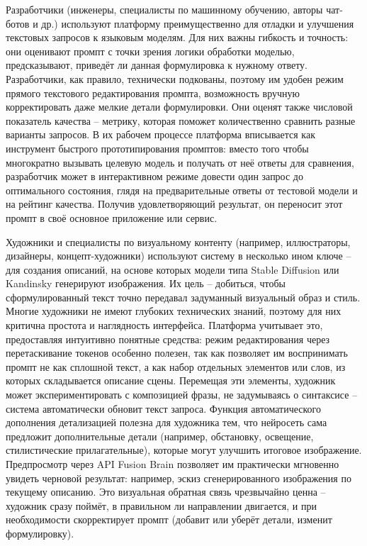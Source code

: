 Разработчики (инженеры, специалисты по машинному обучению, авторы чат-ботов и др.) используют платформу преимущественно для отладки и улучшения текстовых запросов к языковым моделям. Для них важны гибкость и точность: они оценивают промпт с точки зрения логики обработки моделью, предсказывают, приведёт ли данная формулировка к нужному ответу. Разработчики, как правило, технически подкованы, поэтому им удобен режим прямого текстового редактирования промпта, возможность вручную корректировать даже мелкие детали формулировки. Они оценят также числовой показатель качества – метрику, которая поможет количественно сравнить разные варианты запросов. В их рабочем процессе платформа вписывается как инструмент быстрого прототипирования промптов: вместо того чтобы многократно вызывать целевую модель и получать от неё ответы для сравнения, разработчик может в интерактивном режиме довести один запрос до оптимального состояния, глядя на предварительные ответы от тестовой модели и на рейтинг качества. Получив удовлетворяющий результат, он переносит этот промпт в своё основное приложение или сервис.

Художники и специалисты по визуальному контенту (например, иллюстраторы, дизайнеры, концепт-художники) используют систему в несколько ином ключе – для создания описаний, на основе которых модели типа Stable Diffusion или Kandinsky генерируют изображения. Их цель – добиться, чтобы сформулированный текст точно передавал задуманный визуальный образ и стиль. Многие художники не имеют глубоких технических знаний, поэтому для них критична простота и наглядность интерфейса. Платформа учитывает это, предоставляя интуитивно понятные средства: режим редактирования через перетаскивание токенов особенно полезен, так как позволяет им воспринимать промпт не как сплошной текст, а как набор отдельных элементов или слов, из которых складывается описание сцены. Перемещая эти элементы, художник может экспериментировать с композицией фразы, не задумываясь о синтаксисе – система автоматически обновит текст запроса. Функция автоматического дополнения детализацией полезна для художника тем, что нейросеть сама предложит дополнительные детали (например, обстановку, освещение, стилистические прилагательные), которые могут улучшить итоговое изображение. Предпросмотр через API Fusion Brain позволяет им практически мгновенно увидеть черновой результат: например, эскиз сгенерированного изображения по текущему описанию. Это визуальная обратная связь чрезвычайно ценна – художник сразу поймёт, в правильном ли направлении двигается, и при необходимости скорректирует промпт (добавит или уберёт детали, изменит формулировку).

